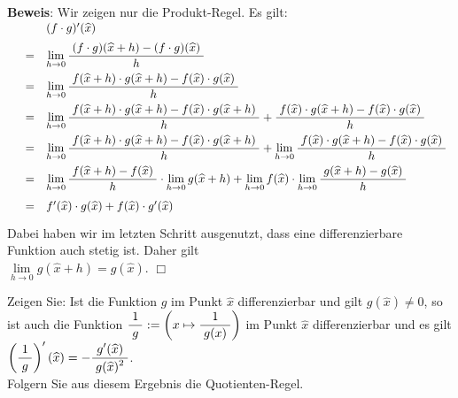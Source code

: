 \noindent
\textbf{Beweis}: Wir zeigen nur die Produkt-Regel.  Es gilt:
\\[0.3cm]
\hspace*{0.3cm}
$
\begin{array}[t]{lcl}
 &   &  (f \cdot g)'(\widehat{x}) \\[0.2cm]
 & = & \lim\limits_{h \rightarrow 0} \displaystyle\frac{\;\displaystyle(f\cdot g)(\widehat{x} + h) - (f\cdot g)(\widehat{x})\;}{\;\displaystyle h\;} \\[0.3cm]
 & = &  \lim\limits_{h \rightarrow 0} \displaystyle\frac{\;\displaystyle f(\widehat{x} + h)\cdot g(\widehat{x} + h) - f(\widehat{x})\cdot g(\widehat{x})\;}{\;\displaystyle h\;} \\[0.3cm]
 & = &  \lim\limits_{h \rightarrow 0} \displaystyle\frac{\;\displaystyle f(\widehat{x} + h)\cdot g(\widehat{x} + h) - f(\widehat{x})\cdot g(\widehat{x} + h)\;}{\;\displaystyle h\;} + 
                                      \displaystyle\frac{\;\displaystyle f(\widehat{x})\cdot g(\widehat{x} + h) - f(\widehat{x})\cdot g(\widehat{x})\;}{\;\displaystyle h\;} \\[0.3cm]
 & = &  \lim\limits_{h \rightarrow 0} \displaystyle\frac{\;\displaystyle f(\widehat{x} + h)\cdot g(\widehat{x} + h) - f(\widehat{x})\cdot g(\widehat{x} + h)\;}{\;\displaystyle h\;} +
        \lim\limits_{h \rightarrow 0} \displaystyle\frac{\;\displaystyle f(\widehat{x})\cdot g(\widehat{x} + h) - f(\widehat{x})\cdot g(\widehat{x})\;}{\;\displaystyle h\;} \\[0.3cm]
 & = &  \lim\limits_{h \rightarrow 0} \displaystyle\frac{\;\displaystyle f(\widehat{x} + h) - f(\widehat{x})\;}{\;\displaystyle h\;} \cdot \lim\limits_{h \rightarrow 0} g(\widehat{x}+h) +
        \lim\limits_{h \rightarrow 0} f(\widehat{x}) \cdot \lim\limits_{h \rightarrow 0} \displaystyle\frac{\;\displaystyle g(\widehat{x} + h) - g(\widehat{x})\;}{\;\displaystyle h\;} \\[0.4cm]
 & = &  f'(\widehat{x}) \cdot  g(\widehat{x}) + f(\widehat{x}) \cdot g'(\widehat{x}) \\[0.3cm]
\end{array}
$
\\[0.3cm]
Dabei haben wir im letzten Schritt ausgenutzt, dass eine differenzierbare Funktion auch stetig ist.
Daher gilt 
\\[0.2cm]
\hspace*{1.3cm}
$\lim\limits_{h \rightarrow 0} g(\widehat{x} + h) = g(\widehat{x})$. \hspace*{\fill} $\Box$
\vspace*{0.3cm}

\exercise
Zeigen Sie: Ist die Funktion $g$ im Punkt $\widehat{x}$ differenzierbar und gilt
$g(\widehat{x}) \not= 0$, so ist auch die Funktion 
$\displaystyle\frac{\;\displaystyle1\;}{\;\displaystyle g\;} := \left(x \mapsto \displaystyle\frac{\;\displaystyle1\;}{\;\displaystyle g(x)\;}\right)$ im Punkt $\widehat{x}$
differenzierbar und es gilt 
\\[0.3cm]
\hspace*{1.3cm} 
$\left(\displaystyle\frac{\;\displaystyle1\;}{\;\displaystyle g\;}\right)'(\widehat{x}) = -\displaystyle\frac{\;\displaystyle g'(\widehat{x})\;}{\;\displaystyle g(\widehat{x})^2\;}$.
\\[0.3cm]
Folgern Sie aus diesem Ergebnis die Quotienten-Regel.
\eox
\pagebreak

